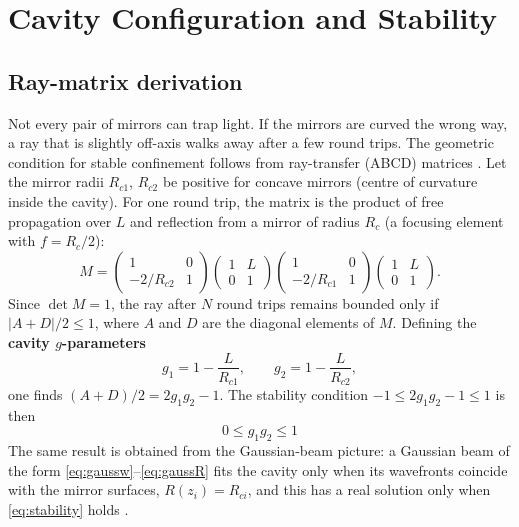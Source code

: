 \documentclass[11pt,a4paper]{article}
\begin{document}
	
	
	
	\section{Cavity Configuration and Stability}
	\label{sec:stability}
	
	\subsection{Ray-matrix derivation}
	
	Not every pair of mirrors can trap light. If the mirrors are curved the wrong way, a ray that is slightly off-axis walks away after a few round trips. The geometric condition for stable confinement follows from ray-transfer (ABCD) matrices \cite{KogelnikLi1966,Siegman,SalehTeich}. Let the mirror radii $R_{c1}$, $R_{c2}$ be positive for concave mirrors (centre of curvature inside the cavity). For one round trip, the matrix is the product of free propagation over $L$ and reflection from a mirror of radius $R_c$ (a focusing element with $f=R_c/2$):
	\begin{equation}
		M=\begin{pmatrix}1&0\\-2/R_{c2}&1\end{pmatrix}
		\begin{pmatrix}1&L\\0&1\end{pmatrix}
		\begin{pmatrix}1&0\\-2/R_{c1}&1\end{pmatrix}
		\begin{pmatrix}1&L\\0&1\end{pmatrix}.
	\end{equation}
	Since $\det M=1$, the ray after $N$ round trips remains bounded only if $|A+D|/2\le 1$, where $A$ and $D$ are the diagonal elements of $M$. Defining the \textbf{cavity $g$-parameters}
	\begin{equation}
		g_1=1-\frac{L}{R_{c1}},\qquad g_2=1-\frac{L}{R_{c2}},
		\label{eq:gparam}
	\end{equation}
	one finds $(A+D)/2=2g_1g_2-1$. The stability condition $-1\le 2g_1g_2-1\le 1$ is then
	\begin{equation}
		\boxed{\,0\le g_1g_2\le 1\,}
		\label{eq:stability}
	\end{equation}
	The same result is obtained from the Gaussian-beam picture: a Gaussian beam of the form \eqref{eq:gaussw}--\eqref{eq:gaussR} fits the cavity only when its wavefronts coincide with the mirror surfaces, $R(z_i)=R_{ci}$, and this has a real solution only when \eqref{eq:stability} holds \cite{KogelnikLi1966}.
	
\end{document}
